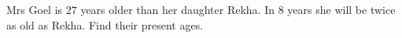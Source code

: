 Mrs Goel is $27$ years older than her daughter Rekha. In $8$ years she will be twice as old as Rekha. Find their present ages.
